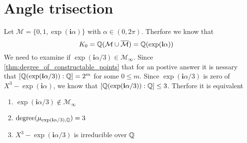 \documentclass{../Proof_layout_PDF/TemplateExercise}
\begin{document}
\section{Angle trisection}
Let $\mathcal{M} = \{0,1,\exp(\textbf{i} \alpha)\}$ with $\alpha \in (0,2\pi)$. Therfore we know that
\begin{equation*}
    K_0 = \mathbb{Q}(\mathcal{M}\cup \overline{\mathcal{M}}) = \mathbb{Q}(\exp(\textbf{i} \alpha))
\end{equation*}
We need to examine if $\exp(\textbf{i} \alpha/3) \in \mathcal{M}_{\infty}$. Since \ref{thm:degree_of_constructable_points}
that for an postive answer it is nessary that $[\mathbb{Q}(\exp(\textbf{i} \alpha/3)):\mathbb{Q}] = 2^m$ for some $0 \le m $. \newline
Since $\exp(\textbf{i} \alpha/3)$ is zero of $X^3 - \exp(\textbf{i} \alpha)$, we know that $[\mathbb{Q}(\exp(\textbf{i} \alpha/3)):\mathbb{Q}] \le 3$.
Therfore it is equivalent
\begin{enumerate}
    \item $\exp(\textbf{i} \alpha/3) \notin \mathcal{M}_{\infty}$
    \item $\text{degree}(\mu_{\exp(\textbf{i} \alpha/3),\mathbb{Q}}) = 3$
    \item $X^3 - \exp(\textbf{i} \alpha/3)$ is irreducible over $\mathbb{Q}$
\end{enumerate}
\end{document}
